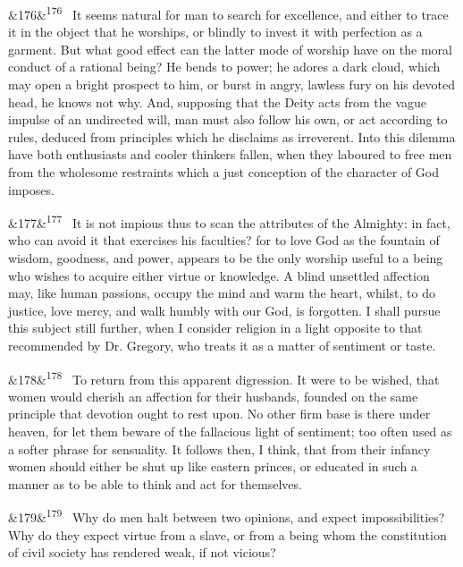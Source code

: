 \documentclass[12pt]{article}
\newcommand{\para}[1][]{\par\noindent\ifx&#1&\else\textsuperscript{\footnotesize #1}~\fi}
\begin{document}
\para[176] It seems natural for man to search for excellence, and either to trace it in the object that he worships, or blindly to invest it with perfection as a garment. But what good effect can the latter mode of worship have on the moral conduct of a rational being? He bends to power; he adores a dark cloud, which may open a bright prospect to him, or burst in angry, lawless fury on his devoted head, he knows not why. And, supposing that the Deity acts from the vague impulse of an undirected will, man must also follow his own, or act according to rules, deduced from principles which he disclaims as irreverent. Into this dilemma have both enthusiasts and cooler thinkers fallen, when they laboured to free men from the wholesome restraints which a just conception of the character of God imposes.

\para[177] It is not impious thus to scan the attributes of the Almighty: in fact, who can avoid it that exercises his faculties? for to love God as the fountain of wisdom, goodness, and power, appears to be the only worship useful to a being who wishes to acquire either virtue or knowledge. A blind unsettled affection may, like human passions, occupy the mind and warm the heart, whilst, to do justice, love mercy, and walk humbly with our God, is forgotten. I shall pursue this subject still further, when I consider religion in a light opposite to that recommended by Dr. Gregory, who treats it as a matter of sentiment or taste.

\para[178] To return from this apparent digression. It were to be wished, that women would cherish an affection for their husbands, founded on the same principle that devotion ought to rest upon. No other firm base is there under heaven, for let them beware of the fallacious light of sentiment; too often used as a softer phrase for sensuality. It follows then, I think, that from their infancy women should either be shut up like eastern princes, or educated in such a manner as to be able to think and act for themselves.

\para[179] Why do men halt between two opinions, and expect impossibilities? Why do they expect virtue from a slave, or from a being whom the constitution of civil society has rendered weak, if not vicious?
\end{document}
